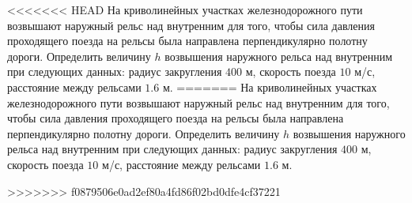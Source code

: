 <<<<<<< HEAD
На криволинейных участках железнодорожного пути возвышают наружный рельс 
над внутренним для того, чтобы сила давления проходящего поезда на 
рельсы была направлена перпендикулярно полотну дороги. Определить 
величину $h$ возвышения наружного рельса над внутренним при следующих
данных: радиус закругления $400$ м, скорость поезда $10$ м/с, расстояние
между рельсами $1.6$ м.
=======
На криволинейных участках железнодорожного пути возвышают наружный
 рельс
 над внутренним для того,
чтобы сила давления проходящего поезда на рельсы была направлена
 перпендикулярно полотну дороги.
Определить величину $h$ возвышения наружного рельса над внутренним при
 следующих данных:
радиус закругления $400$ м, скорость поезда $10$ м/с, расстояние 
между рельсами $1.6$ м.

 
>>>>>>> f0879506e0ad2ef80a4fd86f02bd0dfe4cf37221
